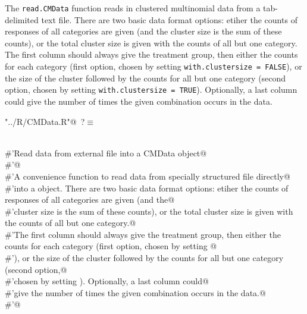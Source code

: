 \documentclass[reqno]{amsart}
\renewcommand{\NWtarget}[2]{\hypertarget{#1}{#2}}
\begin{document}
The \texttt{read.CMData} function reads in clustered multinomial data from a tab-delimited
text file. There are two basic data format options:  etiher the counts of responses of all categories are given (and the
cluster size is the sum of these counts), or  the total cluster size is given with the counts of all but one category.
The first column should always give the treatment group, then either the counts for each category (first option, chosen by setting 
\texttt{with.clustersize = FALSE}), or the size of the cluster followed by the counts for all but one category (second option,
chosen by setting \texttt{with.clustersize = TRUE}). Optionally, a last column could
give the number of times the given combination occurs in the data.

\begin{flushleft} \small
\begin{minipage}{\linewidth}\label{scrap3}\raggedright\small
\NWtarget{nuweb?}{} \verb@"../R/CMData.R"@\nobreak\ {\footnotesize {?}}$\equiv$
\vspace{-1ex}
\begin{list}{}{} \item
\mbox{}\verb@@\\
\mbox{}\verb@#'Read data from external file into a CMData object@\\
\mbox{}\verb@#'@\\
\mbox{}\verb@#'A convenience function to read data from specially structured file directly@\\
\mbox{}\verb@#'into a  object. There are two basic data format options:  etiher the counts of responses of all categories are given (and the@\\
\mbox{}\verb@#'cluster size is the sum of these counts), or  the total cluster size is given with the counts of all but one category.@\\
\mbox{}\verb@#'The first column should always give the treatment group, then either the counts for each category (first option, chosen by setting @\\
\mbox{}\verb@#'), or the size of the cluster followed by the counts for all but one category (second option,@\\
\mbox{}\verb@#'chosen by setting ). Optionally, a last column could@\\
\mbox{}\verb@#'give the number of times the given combination occurs in the data.@\\
\mbox{}\verb@#'@\\

\end{list}
\end{minipage}
\end{flushleft}
\end{document}
